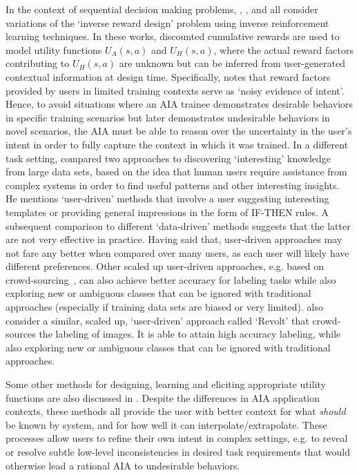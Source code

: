 In the context of sequential decision making problems, \citet{Hadfield-Menell2017-tl}, \citet{Hadfield-Menell2016-ws}, and \citet{Huang2017-lk} all consider variations of the `inverse reward design' problem using inverse reinforcement learning techniques. In these works, discounted cumulative rewards are used to model utility functions $U_A(s,a)$ and $U_H(s,a)$, where the actual reward factors contributing to $U_H(s,a)$ are unknown but can be inferred from user-generated contextual information at design time. Specifically, \cite{Hadfield-Menell2017-tl} notes that reward factors provided by users in limited training contexts serve as `noisy evidence of intent'. Hence, to avoid situations where an AIA trainee demonstrates desirable behaviors in specific training scenarios but later demonstrates undesirable behaviors in novel scenarios, the AIA must be able to reason over the uncertainty in the user's intent in order to fully capture the context in which it was trained. 
In a different task setting, \citet{Freitas2006-qo} compared two approaches to discovering `interesting' knowledge from large data sets, based on the idea that human users require assistance from complex systems in order to find useful patterns and other interesting insights. He mentions `user-driven' methods that involve a user suggesting interesting templates or providing general impressions in the form of IF-THEN rules. A subsequent comparison to different `data-driven' methods suggests that the latter are not very effective in practice. 
Having said that, user-driven approaches may not fare any better when compared over many users, as each user will likely have different preferences. Other scaled up user-driven approaches, e.g. based on crowd-sourcing~\citet{Chang2017-kl}, can also achieve better accuracy for labeling tasks while also exploring new or ambiguous classes that can be ignored with traditional approaches (especially if training data sets are biased or very limited). \citet{Chang2017-kl} also consider a similar, scaled up, `user-driven' approach called `Revolt' that crowd-sources the labeling of images. It is able to attain high accuracy labeling, while also exploring new or ambiguous classes that can be ignored with traditional approaches. 

Some other methods for designing, learning and eliciting appropriate utility functions are also discussed in \cite{Hadfield-Menell2016-ws,Da_Veiga2012-gh,Garcia2015-rs}.
Despite the differences in AIA application contexts, these methods all provide the user with better context for what \emph{should} be known by system, and for how well it can interpolate/extrapolate. 
These processes allow users to refine their own intent in complex settings, e.g. to reveal or resolve subtle low-level inconsistencies in desired task requirements that would otherwise lead a rational AIA to undesirable behaviors. 

